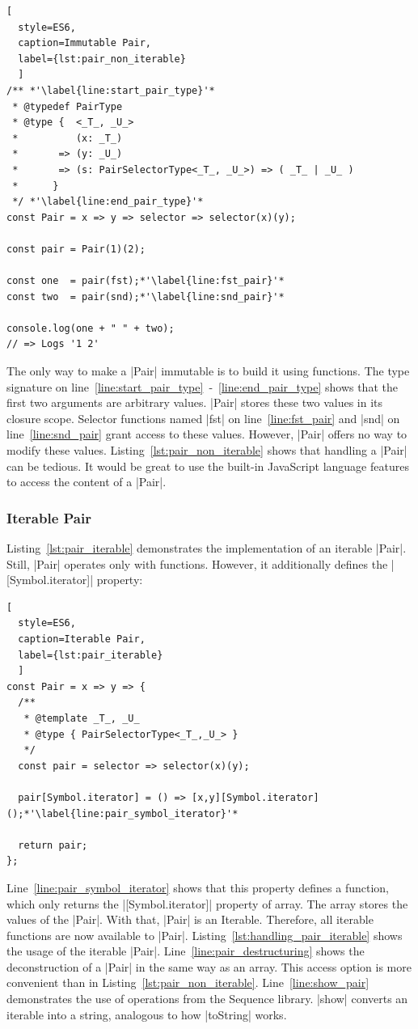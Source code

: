 \begin{lstlisting}[
  style=ES6, 
  caption=Immutable Pair,
  label={lst:pair_non_iterable}
  ]
/** *'\label{line:start_pair_type}'*
 * @typedef PairType
 * @type {  <_T_, _U_>
 *          (x: _T_)
 *       => (y: _U_)
 *       => (s: PairSelectorType<_T_, _U_>) => ( _T_ | _U_ ) 
 *      }
 */ *'\label{line:end_pair_type}'*
const Pair = x => y => selector => selector(x)(y);

const pair = Pair(1)(2);

const one  = pair(fst);*'\label{line:fst_pair}'*
const two  = pair(snd);*'\label{line:snd_pair}'*

console.log(one + " " + two);
// => Logs '1 2'
\end{lstlisting}

The only way to make a |Pair| immutable is to build it using functions. The type 
signature on line~\ref{line:start_pair_type}~-~\ref{line:end_pair_type} shows 
that the first two arguments are arbitrary values. |Pair| stores these two values
in its closure scope. 
Selector functions named |fst| on line~\ref{line:fst_pair} and |snd| on 
line~\ref{line:snd_pair} grant access to these values. However, |Pair| offers
no way to modify these values. Listing~\ref{lst:pair_non_iterable} shows that
handling a |Pair| can be tedious. It would be great to use the built-in
JavaScript language features to access the content of a |Pair|. 

\subsubsection{Iterable Pair}
\label{subsub:Iterable Pair}
Listing~\ref{lst:pair_iterable} demonstrates the implementation of an iterable 
|Pair|. Still, |Pair| operates only with functions. However, it additionally defines the
|[Symbol.iterator]| property:

\begin{lstlisting}[
  style=ES6, 
  caption=Iterable Pair,
  label={lst:pair_iterable}
  ]
const Pair = x => y => {
  /**
   * @template _T_, _U_
   * @type { PairSelectorType<_T_,_U_> }
   */
  const pair = selector => selector(x)(y);

  pair[Symbol.iterator] = () => [x,y][Symbol.iterator]();*'\label{line:pair_symbol_iterator}'*

  return pair;
};
\end{lstlisting}

Line~\ref{line:pair_symbol_iterator} shows that 
this property defines a function, which only returns the |[Symbol.iterator]| 
property of array. The array stores the values of the |Pair|. With that, |Pair|
is an Iterable. Therefore, all iterable functions are now available to |Pair|.
Listing~\ref{lst:handling_pair_iterable} shows the usage of the iterable |Pair|. 
Line~\ref{line:pair_destructuring} shows the deconstruction of a |Pair| in the same way as an array. 
This access option is more convenient than in Listing~\ref{lst:pair_non_iterable}. 
Line~\ref{line:show_pair} demonstrates the use of operations from the Sequence 
library. |show| converts an iterable into a string, analogous to how |toString|
works.

